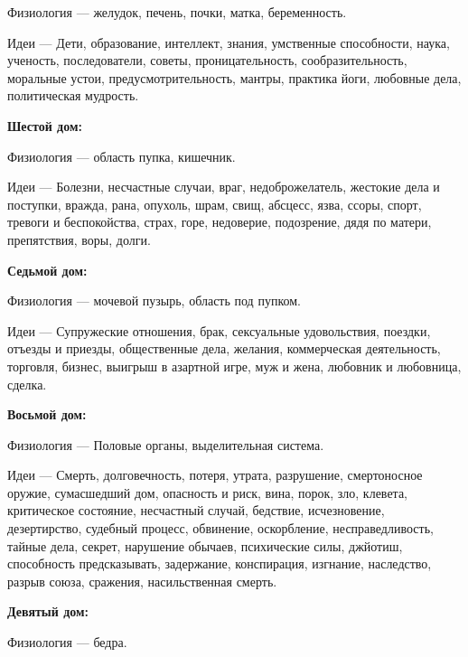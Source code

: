 \begin{myenum}
\begin{mydescr}
			\item[Физиология] --- желудок, печень, почки, матка, беременность. 
			\item[Идеи] --- Дети, образование, интеллект, знания, умственные способности, наука, ученость, последователи, советы, проницательность, сообразительность, моральные устои, предусмотрительность, мантры, практика йоги, любовные дела, политическая мудрость.
		\end{mydescr}
	\item \textbf{Шестой дом:}
		\begin{mydescr}
			\item[Физиология] --- область пупка, кишечник.
			\item[Идеи] --- Болезни, несчастные случаи, враг, недоброжелатель, жестокие дела и поступки, вражда, рана, опухоль, шрам, свищ, абсцесс, язва, ссоры, спорт, тревоги и беспокойства, страх, горе, недоверие, подозрение, дядя по матери, препятствия, воры, долги.
		\end{mydescr}
	\item \textbf{Седьмой дом:}
		\begin{mydescr}
			\item[Физиология] --- мочевой пузырь, область под пупком.
			\item[Идеи] --- Супружеские отношения, брак, сексуальные удовольствия, поездки, отъезды и приезды, общественные дела, желания, коммерческая деятельность, торговля, бизнес, выигрыш в азартной игре, муж и жена, любовник и любовница, сделка.
		\end{mydescr}
	\item \textbf{Восьмой дом:}
		\begin{mydescr}
			\item[Физиология] --- Половые органы, выделительная система.
			\item[Идеи] --- Смерть, долговечность, потеря, утрата, разрушение, смертоносное оружие, сумасшедший дом, опасность и риск, вина, порок, зло, клевета, критическое состояние, несчастный случай, бедствие, исчезновение, дезертирство, судебный процесс, обвинение, оскорбление, несправедливость, тайные дела, секрет, нарушение обычаев, психические силы, джйотиш, способность предсказывать, задержание, конспирация, изгнание, наследство, разрыв союза, сражения, насильственная смерть.
		\end{mydescr}
	\item \textbf{Девятый дом:}
		\begin{mydescr}
			\item[Физиология] --- бедра.

\end{mydescr}
\end{myenum}
